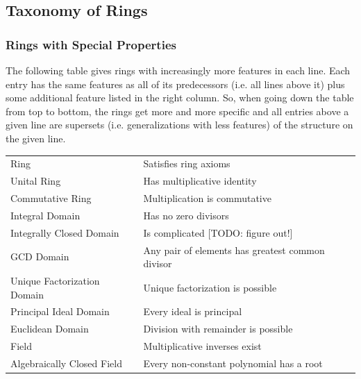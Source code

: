 

\subsection{Taxonomy of Rings}

\subsubsection{Rings with Special Properties}
The following table gives rings with increasingly more features in each line. Each entry has the same features as all of its predecessors (i.e. all lines above it) plus some additional feature listed in the right column. So, when going down the table from top to bottom, the rings get more and more specific and all entries above a given line are supersets (i.e. generalizations with less features) of the structure on the given line.

\medskip
\begin{tabular}{l l}
Ring                        & Satisfies ring axioms \\
Unital Ring                 & Has multiplicative identity \\
Commutative Ring            & Multiplication is commutative \\
Integral Domain             & Has no zero divisors \\
Integrally Closed Domain    & Is complicated [TODO: figure out!] \\
GCD Domain                  & Any pair of elements has greatest common divisor \\
Unique Factorization Domain & Unique factorization is possible \\
Principal Ideal Domain      & Every ideal is principal \\
Euclidean Domain            & Division with remainder is possible \\
Field                       & Multiplicative inverses exist \\
Algebraically Closed Field  & Every non-constant polynomial has a root
\end{tabular}
\medskip


